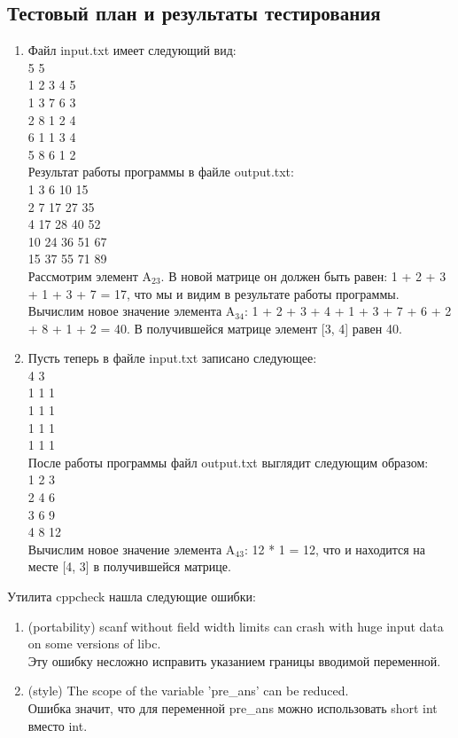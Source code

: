 \documentclass[12pt,a4paper]{report}
\begin{document}
\subsection{Тестовый план и результаты тестирования}
\begin{enumerate}
\item Файл input.txt имеет следующий вид: \\
5 5 \\
1 2 3 4 5 \\
1 3 7 6 3 \\
2 8 1 2 4 \\
6 1 1 3 4 \\
5 8 6 1 2 \\
Результат работы программы в файле output.txt:\\
1 3 6 10 15 \\
2 7 17 27 35 \\
4 17 28 40 52 \\
10 24 36 51 67 \\
15 37 55 71 89 \\
Рассмотрим элемент A$_{2 3}$. В новой матрице он должен быть равен: 1 + 2 + 3 + 1 + 3 + 7 = 17, что мы и видим в результате работы программы. Вычислим новое значение элемента A$_{3 4}$: 1 + 2 + 3 + 4 + 1 + 3 + 7 + 6 + 2 + 8 + 1 + 2 = 40. В получившейся матрице элемент [3, 4] равен 40. 
\item Пусть теперь в файле input.txt записано следующее: \\
4 3 \\
1 1 1 \\
1 1 1 \\
1 1 1 \\
1 1 1 \\
После работы программы файл output.txt выглядит следующим образом: \\
1 2 3 \\
2 4 6 \\
3 6 9 \\
4 8 12 \\
Вычислим новое значение элемента A$_{4 3}$: 12 * 1 = 12, что и находится на месте [4, 3] в получившейся матрице. 
\end{enumerate} 
Утилита cppcheck нашла следующие ошибки: \\
\begin{enumerate}
\item (portability) scanf without field width limits can crash with huge input data on some versions of libc. \\
Эту ошибку несложно исправить указанием границы вводимой переменной.
\item (style) The scope of the variable 'pre\_ans' can be reduced.\\
Ошибка значит, что для переменной pre\_ans можно использовать short int вместо int. 
\end{enumerate}
\end{document}
